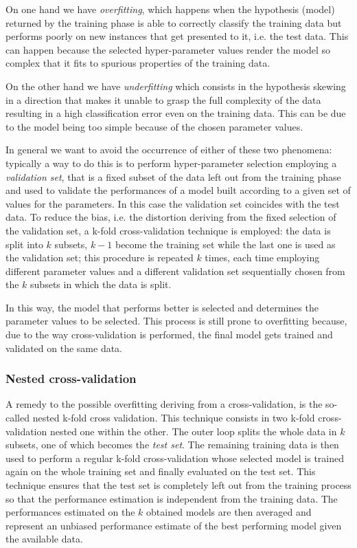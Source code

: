 On one hand we have \emph{overfitting}, which happens when the hypothesis
(model) returned by the training phase is able to correctly classify the training data
but performs poorly on new instances that get presented to it, i.e. the test data.
This can happen because the selected hyper-parameter values render the model so
complex that it fits to spurious properties of the training data.

On the other hand we have \emph{underfitting} which consists in the hypothesis skewing
in a direction that makes it unable to grasp the full complexity of the data resulting
in a high classification error even on the training data.
This can be due to the model being too simple because of the chosen parameter values. 

In general we want to avoid the occurrence of either of these two phenomena:
typically a way to do this is to perform hyper-parameter selection employing
a \emph{validation set}, that is a fixed subset of the data left out from the
training phase and used to validate the performances of a model built according
to a given set of values for the parameters.
In this case the validation set coincides with the test data.
To reduce the bias, i.e. the distortion deriving from the fixed selection of
the validation set, a k-fold cross-validation technique is employed: the
data is split into $k$ subsets, $k-1$ become the training set while the last one
is used as the validation set; this procedure is repeated $k$ times, each time employing
different parameter values and a different validation set sequentially chosen from the
$k$ subsets in which the data is split.

In this way, the model that performs better is selected and determines the parameter
values to be selected.
This process is still prone to overfitting because, due to the way cross-validation
is performed, the final model gets trained and validated on the same
data.

\subsubsection{Nested cross-validation}
A remedy to the possible overfitting deriving from a cross-validation, is
the so-called nested k-fold cross validation.
This technique consists in two k-fold cross-validation nested one within the other.
The outer loop splits the whole data in $k$ subsets, one of which becomes the
\emph{test set}.
The remaining training data is then used to perform a regular k-fold cross-validation
whose selected model is trained again on the whole training set and finally evaluated
on the test set.
This technique ensures that the test set is completely left out from the training
process so that the performance estimation is independent from the training data.
The performances estimated on the $k$ obtained models are then averaged and represent
an unbiased performance estimate of the best performing model given the available data.

